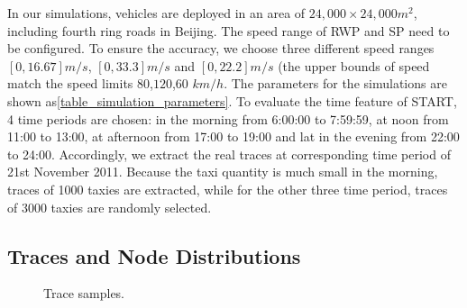 In our simulations, vehicles are deployed in an area of $24,000\times 24,000 m^2$, including fourth ring roads in Beijing. The speed range of RWP and SP need to be configured.
To ensure the accuracy, we choose three different speed ranges $[0,16.67]m/s$, $[0,33.3]m/s$ and $[0,22.2]m/s$ (the upper bounds of speed match the speed limits $80$,$120$,$60$ $km/h$. The parameters for the simulations are shown as\ref{table_simulation_parameters}.
To evaluate the time feature of START, 4 time periods are chosen: in the morning from 6:00:00 to 7:59:59, at noon from 11:00 to 13:00, at afternoon from 17:00 to 19:00 and lat in the evening from 22:00 to 24:00. Accordingly, we extract the real traces at corresponding time period of 21st November 2011. Because the taxi quantity is much small in the morning, traces of 1000 taxies are extracted, while for the other three time period, traces of 3000 taxies are randomly selected. 


\subsection{Traces and Node Distributions}

\begin{figure}[!t]
\centering
{}
\caption{Trace samples.}\label{figure_tracesample}
\end{figure}

